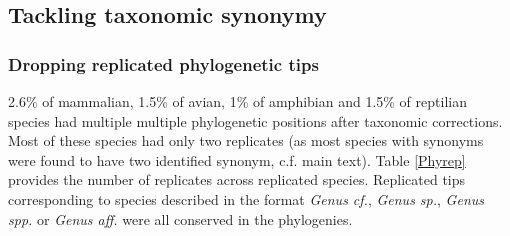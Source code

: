 \documentclass[11pt]{article}
\begin{document}
\pagebreak
\subsection{Tackling taxonomic synonymy}


\subsubsection{Dropping replicated phylogenetic tips}
2.6\% of mammalian, 1.5\% of avian, 1\% of amphibian and  1.5\% of reptilian species had multiple multiple phylogenetic positions after taxonomic corrections. Most of these species had only two replicates (as most species with synonyms were found to have two identified synonym, c.f. main text). Table \ref{Phyrep} provides the number of replicates across replicated species. Replicated tips corresponding to species described in the format \textit{Genus cf.}, \textit{Genus sp.}, \textit{Genus spp.} or \textit{Genus aff.} were all conserved in the phylogenies.
\end{document}
